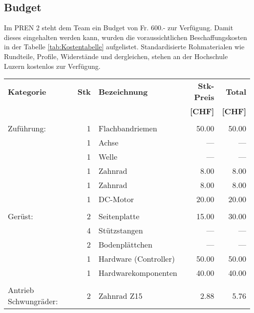 \subsection{Budget}
    Im PREN 2 steht dem Team ein Budget von Fr. 600.- zur Verfügung. Damit 
    dieses eingehalten werden kann, wurden die voraussichtlichen 
    Beschaffungskosten in der Tabelle \ref{tab:Kostentabelle} aufgelistet. 
    Standardisierte Rohmaterialen wie Rundteile, Profile, Widerstände und 
    dergleichen, stehen an der Hochschule Luzern kostenlos zur Verfügung.
    \begin{longtable}{p{1.7cm}rlrr}
    \textbf{Kategorie} & \textbf{Stk} & \textbf{Bezeichnung} & \textbf{Stk-Preis}
    & \textbf{Total} \\ & & & \textbf{[CHF]} & \textbf{[CHF]} \\       
    \hline     &       &                              &        &        \\
    Zuführung: & 1     & Flachbandriemen              &  50.00 &  50.00 \\
               & 1     & Achse                        &  {---} &  {---} \\
               & 1     & Welle                        &  {---} &  {---} \\
               & 1     & Zahnrad                      &   8.00 &   8.00 \\
               & 1     & Zahnrad                      &   8.00 &   8.00 \\
               & 1     & DC-Motor                     &  20.00 &  20.00 \\
               &       &                              &        &        \\
       Gerüst: & 2     & Seitenplatte                 &  15.00 &  30.00 \\
               & 4     & Stützstangen                 &  {---} &  {---} \\
               & 2     & Bodenplättchen               &  {---} &  {---} \\
               & 1     & Hardware (Controller)        &  50.00 &  50.00 \\
               & 1     & Hardwarekomponenten          &  40.00 &  40.00 \\
               &       &                              &        &        \\
   \multirow{2}{1.7cm}{Antrieb Schwungräder:}  
               & 2     & Zahnrad Z15                  &   2.88 &   5.76 \\

\end{longtable}
